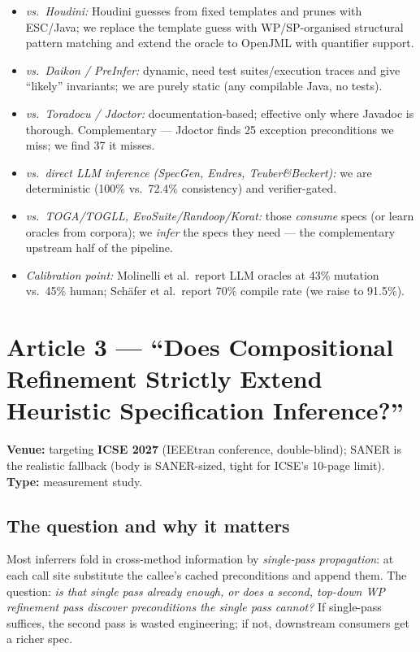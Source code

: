 \documentclass[11pt]{article}
\begin{document}
\begin{itemize}[leftmargin=1.4em,itemsep=0.05em]
  \item \emph{vs.\ Houdini:} Houdini guesses from fixed templates and prunes
        with ESC/Java; we replace the template guess with WP/SP-organised
        structural pattern matching and extend the oracle to OpenJML with
        quantifier support.
  \item \emph{vs.\ Daikon / PreInfer:} dynamic, need test suites/execution
        traces and give ``likely'' invariants; we are purely static (any
        compilable Java, no tests).
  \item \emph{vs.\ Toradocu / Jdoctor:} documentation-based; effective only
        where Javadoc is thorough. Complementary --- Jdoctor finds 25
        exception preconditions we miss; we find 37 it misses.
  \item \emph{vs.\ direct LLM inference (SpecGen, Endres, Teuber\&Beckert):}
        we are deterministic (100\% vs.\ 72.4\% consistency) and verifier-gated.
  \item \emph{vs.\ TOGA/TOGLL, EvoSuite/Randoop/Korat:} those \emph{consume}
        specs (or learn oracles from corpora); we \emph{infer} the specs they
        need --- the complementary upstream half of the pipeline.
  \item \emph{Calibration point:} Molinelli et al.\ report LLM oracles at 43\%
        mutation vs.\ 45\% human; Sch\"afer et al.\ report 70\% compile rate
        (we raise to 91.5\%).
\end{itemize}

\section{Article 3 --- ``Does Compositional Refinement Strictly Extend Heuristic Specification Inference?''}
\label{sec:a3}

\textbf{Venue:} targeting \textbf{ICSE 2027} (IEEEtran conference, double-blind);
SANER is the realistic fallback (body is SANER-sized, tight for ICSE's
10-page limit). \textbf{Type:} measurement study.

\subsection{The question and why it matters}

Most inferrers fold in cross-method information by \emph{single-pass
propagation}: at each call site substitute the callee's cached preconditions
and append them. The question: \emph{is that single pass already enough, or
does a second, top-down WP refinement pass discover preconditions the single
pass cannot?} If single-pass suffices, the second pass is wasted engineering;
if not, downstream consumers get a richer spec.
\end{document}
